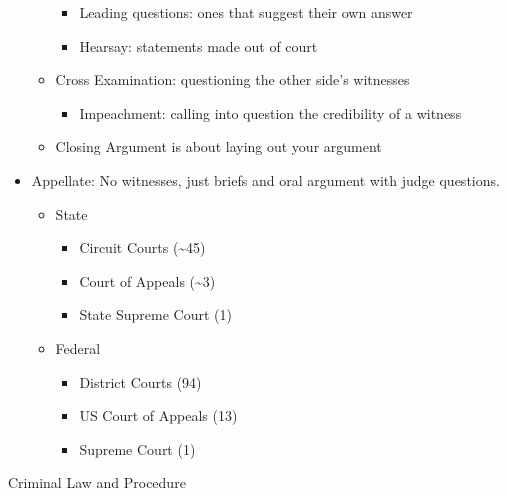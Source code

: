 \documentclass[
]{article}
\providecommand{\tightlist}{%
  \setlength{\itemsep}{0pt}\setlength{\parskip}{0pt}}
\begin{document}
\begin{itemize}
\begin{itemize}
    \begin{itemize}
    \item
      Leading questions: ones that suggest their own answer
    \item
      Hearsay: statements made out of court
    \end{itemize}
  \item
    Cross Examination: questioning the other side's witnesses

    \begin{itemize}
    \tightlist
    \item
      Impeachment: calling into question the credibility of a witness
    \end{itemize}
  \item
    Closing Argument is about laying out your argument
  \end{itemize}
\item
  Appellate: No witnesses, just briefs and oral argument with judge
  questions.

  \begin{itemize}
  \item
    State

    \begin{itemize}
    \item
      Circuit Courts (\textasciitilde45)
    \item
      Court of Appeals (\textasciitilde3)
    \item
      State Supreme Court (1)
    \end{itemize}
  \item
    Federal

    \begin{itemize}
    \item
      District Courts (94)
    \item
      US Court of Appeals (13)
    \item
      Supreme Court (1)
    \end{itemize}
  \end{itemize}
\end{itemize}

Criminal Law and Procedure
\end{document}
